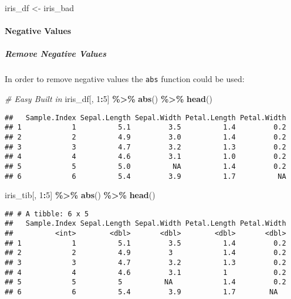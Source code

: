 \documentclass[
]{article}
\newenvironment{Shaded}{\begin{snugshade}}{\end{snugshade}}
\newcommand{\CommentTok}[1]{\textcolor[rgb]{0.56,0.35,0.01}{\textit{#1}}}
\newcommand{\DecValTok}[1]{\textcolor[rgb]{0.00,0.00,0.81}{#1}}
\newcommand{\KeywordTok}[1]{\textcolor[rgb]{0.13,0.29,0.53}{\textbf{#1}}}
\newcommand{\NormalTok}[1]{#1}
\newcommand{\OperatorTok}[1]{\textcolor[rgb]{0.81,0.36,0.00}{\textbf{#1}}}
\newcommand{\StringTok}[1]{\textcolor[rgb]{0.31,0.60,0.02}{#1}}
\begin{document}
\begin{Shaded}
\begin{Highlighting}[]
\NormalTok{iris\_df <{-}}\StringTok{ }\NormalTok{iris\_bad}
\end{Highlighting}
\end{Shaded}

\hypertarget{negative-values}{%
\paragraph{Negative Values}\label{negative-values}}

\hypertarget{remove-negative-values}{%
\subparagraph{Remove Negative Values}\label{remove-negative-values}}

In order to remove negative values the \texttt{abs} function could be
used:

\begin{Shaded}
\begin{Highlighting}[]
\CommentTok{\# Easy Built in}
\NormalTok{iris\_df[, }\DecValTok{1}\OperatorTok{:}\DecValTok{5}\NormalTok{] }\OperatorTok{\%>\%}\StringTok{ }\KeywordTok{abs}\NormalTok{() }\OperatorTok{\%>\%}\StringTok{ }\KeywordTok{head}\NormalTok{()}
\end{Highlighting}
\end{Shaded}

\begin{verbatim}
##   Sample.Index Sepal.Length Sepal.Width Petal.Length Petal.Width
## 1            1          5.1         3.5          1.4         0.2
## 2            2          4.9         3.0          1.4         0.2
## 3            3          4.7         3.2          1.3         0.2
## 4            4          4.6         3.1          1.0         0.2
## 5            5          5.0          NA          1.4         0.2
## 6            6          5.4         3.9          1.7          NA
\end{verbatim}

\begin{Shaded}
\begin{Highlighting}[]
\NormalTok{iris\_tib[, }\DecValTok{1}\OperatorTok{:}\DecValTok{5}\NormalTok{] }\OperatorTok{\%>\%}\StringTok{ }\KeywordTok{abs}\NormalTok{() }\OperatorTok{\%>\%}\StringTok{ }\KeywordTok{head}\NormalTok{()}
\end{Highlighting}
\end{Shaded}

\begin{verbatim}
## # A tibble: 6 x 5
##   Sample.Index Sepal.Length Sepal.Width Petal.Length Petal.Width
##          <int>        <dbl>       <dbl>        <dbl>       <dbl>
## 1            1          5.1         3.5          1.4         0.2
## 2            2          4.9         3            1.4         0.2
## 3            3          4.7         3.2          1.3         0.2
## 4            4          4.6         3.1          1           0.2
## 5            5          5          NA            1.4         0.2
## 6            6          5.4         3.9          1.7        NA
\end{verbatim}
\end{document}

